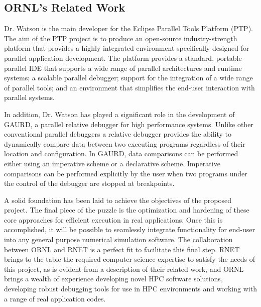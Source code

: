 \subsection{ORNL's Related Work}
\label{sec:nice}

Dr. Watson is the main developer for the Eclipse Parallel Tools Platform (PTP). The aim of the PTP project is to produce an open-source industry-strength platform that provides a highly integrated environment specifically designed for parallel application development. The platform provides a standard, portable parallel IDE that supports a wide range of parallel architectures and runtime systems; a scalable parallel debugger; support for the integration of a wide range of parallel tools; and an environment that simplifies the end-user interaction with parallel systems. 

In addition, Dr. Watson has played a significant role in the development of GAURD, a parallel relative debugger for high performance systems. Unlike other conventional parallel debuggers a relative debugger provides the
ability to dynamically compare data between two executing programs regardless of their location and configuration. In GAURD, data
comparisons can be performed either using an imperative scheme or a declarative scheme. Imperative comparisons can be performed
explicitly by the user when two programs under the control of the debugger are stopped at breakpoints. 

A solid foundation has been laid to achieve the objectives of the proposed project. The final 
 piece of the puzzle is the optimization and hardening of these core approaches for efficient execution in real applications. 
 Once this is accomplished, it will be possible to seamlessly integrate functionality for end-user \VV into any general purpose 
 numerical simulation software. The collaboration between ORNL and 
RNET is a perfect fit to facilitate this final step. RNET brings to the table the required computer science expertise to 
satisfy the needs of this project, as is evident from a description of their related work, and ORNL brings a wealth of experience developing novel
HPC software solutions, developing robust debugging tools for use in HPC environments and working with a range of real application codes. 
